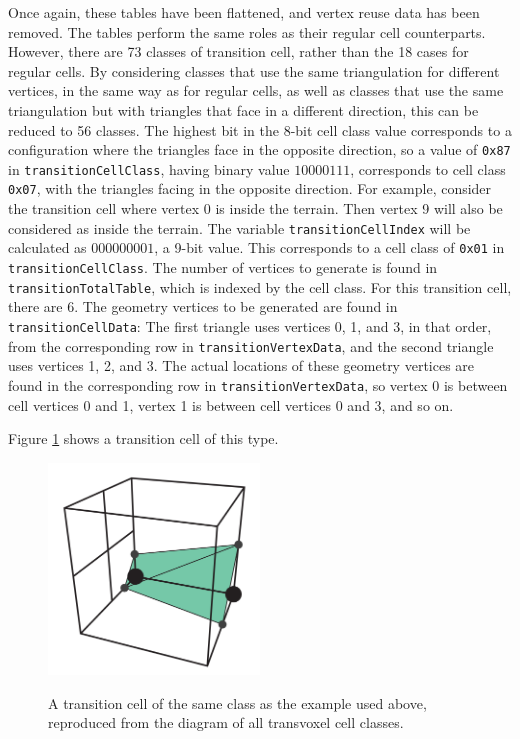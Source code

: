 \documentclass{article}
\begin{document}
Once again, these tables have been flattened, and vertex reuse data has been removed. The tables perform the same roles as their regular cell counterparts. However, there are 73 classes of transition cell, rather than the 18 cases for regular cells. By considering classes that use the same triangulation for different vertices, in the same way as for regular cells, as well as classes that use the same triangulation but with triangles that face in a different direction, this can be reduced to 56 classes. The highest bit in the 8-bit cell class value corresponds to a configuration where the triangles face in the opposite direction, so a value of \texttt{0x87} in \texttt{transitionCellClass}, having binary value $10000111$, corresponds to cell class \texttt{0x07}, with the triangles facing in the opposite direction. 
For example, consider the transition cell where vertex 0 is inside the terrain. Then vertex 9 will also be considered as inside the terrain. The variable \texttt{transitionCellIndex} will be calculated as $000000001$, a 9-bit value. This corresponds to a cell class of \texttt{0x01} in \texttt{transitionCellClass}. The number of vertices to generate is found in \texttt{transitionTotalTable}, which is indexed by the cell class. For this transition cell, there are 6. The geometry vertices to be generated are found in \texttt{transitionCellData}: The first triangle uses vertices 0, 1, and 3, in that order, from the corresponding row in \texttt{transitionVertexData}, and the second triangle uses vertices 1, 2, and 3.
The actual locations of these geometry vertices are found in the corresponding row in \texttt{transitionVertexData}, so vertex 0 is between cell vertices 0 and 1, vertex 1 is between cell vertices 0 and 3, and so on.

Figure \ref{fig:transition_cell_example_case} shows a transition cell of this type.
\begin{figure}
  \caption{A transition cell of the same class as the example used above, reproduced from the diagram of all transvoxel cell classes\cite{lengyel}.}
  \includegraphics[width=0.5\textwidth]{transition_cell_example_case.PNG}
  \label{fig:transition_cell_example_case}
\end{figure}
\end{document}
